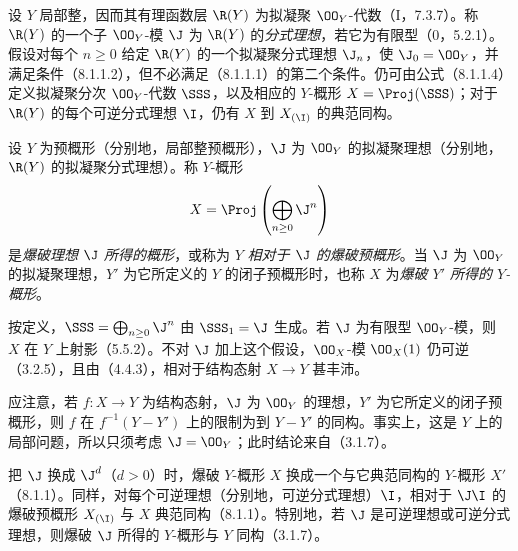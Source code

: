 设 $Y$ 局部整，因而其有理函数层 $\R(Y)$ 为拟凝聚 $\OO_Y$-代数（I，7.3.7）。称 $\R(Y)$ 的一个子 $\OO_Y$-模 $\J$ 为 $\R(Y)$ 的\emph{分式理想}，若它为有限型（0，5.2.1）。假设对每个 $n\geq0$ 给定 $\R(Y)$ 的一个拟凝聚分式理想 $\J_n$，使 $\J_0=\OO_Y$，并满足条件（8.1.1.2），但不必满足（8.1.1.1）的第二个条件。仍可由公式（8.1.1.4）定义拟凝聚分次 $\OO_Y$-代数 $\SSS$，以及相应的 $Y$-概形 $X=\Proj(\SSS)$；对于 $\R(Y)$ 的每个可逆分式理想 $\I$，仍有 $X$ 到 $X_{(\I)}$ 的典范同构。

设 $Y$ 为预概形（分别地，局部整预概形），$\J$ 为 $\OO_Y$ 的拟凝聚理想（分别地，$\R(Y)$ 的拟凝聚分式理想）。称 $Y$-概形
\[
X=\Proj\left(\bigoplus_{n\geq0}\J^n\right)
\]
是\emph{爆破理想 $\J$ 所得的概形}，或称为 $Y$ \emph{相对于 $\J$ 的爆破预概形}。当 $\J$ 为 $\OO_Y$ 的拟凝聚理想，$Y'$ 为它所定义的 $Y$ 的闭子预概形时，也称 $X$ 为\emph{爆破 $Y'$ 所得的 $Y$-概形}。

按定义，$\SSS=\bigoplus_{n\geq0}\J^n$ 由 $\SSS_1=\J$ 生成。若 $\J$ 为有限型 $\OO_Y$-模，则 $X$ 在 $Y$ 上射影（5.5.2）。不对 $\J$ 加上这个假设，$\OO_X$-模 $\OO_X(1)$ 仍可逆（3.2.5），且由（4.4.3），相对于结构态射 $X\to Y$ 甚丰沛。

应注意，若 $f:X\to Y$ 为结构态射，$\J$ 为 $\OO_Y$ 的理想，$Y'$ 为它所定义的闭子预概形，则 $f$ 在 $f^{-1}(Y-Y')$ 上的限制为到 $Y-Y'$ 的同构。事实上，这是 $Y$ 上的局部问题，所以只须考虑 $\J=\OO_Y$；此时结论来自（3.1.7）。

把 $\J$ 换成 $\J^d$（$d>0$）时，爆破 $Y$-概形 $X$ 换成一个与它典范同构的 $Y$-概形 $X'$（8.1.1）。同样，对每个可逆理想（分别地，可逆分式理想）$\I$，相对于 $\J\I$ 的爆破预概形 $X_{(\I)}$ 与 $X$ 典范同构（8.1.1）。特别地，若 $\J$ 是可逆理想或可逆分式理想，则爆破 $\J$ 所得的 $Y$-概形与 $Y$ 同构（3.1.7）。

